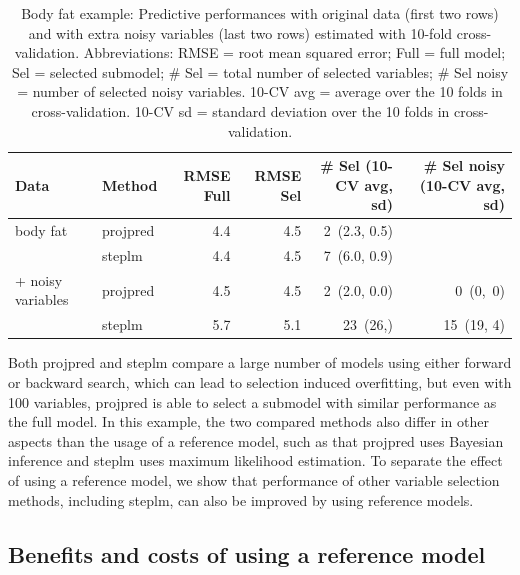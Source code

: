 \documentclass[a4]{article}
\theoremstyle{definition}
\begin{document}
\begin{table}[tp]
\footnotesize
\centering
\begin{tabular}{ll|rrrr}
Data  & Method & RMSE Full & RMSE Sel & \# Sel (10-CV avg, sd) & \# Sel noisy (10-CV avg, sd) \\ 
  \hline
body fat & projpred & 4.4 & 4.5 &  2\, (2.3, 0.5) &   \\
& steplm & 4.4 & 4.5 & 7\, (6.0, 0.9) &  \\
\hline
+ noisy variables & projpred & 4.5 & 4.5 &  2\, (2.0, 0.0)&  0\,\; (0,\, 0)  \\
& steplm & 5.7 & 5.1 & 23\, (26,\; 4.5) &  15\, (19, 4) \\
\end{tabular}
\caption{Body fat example: Predictive performances with original data (first two
  rows) and with extra noisy variables (last two rows) estimated with
  10-fold cross-validation. Abbreviations: RMSE = root mean squared error;
  Full = full model; Sel = selected submodel; 
  \# Sel = total number of selected variables;
  \# Sel noisy = number of selected noisy variables. 
  10-CV avg = average over the 10 folds in cross-validation. 10-CV sd = standard deviation
  over the 10 folds in cross-validation.}
\label{tab:model_performances}
\end{table}

Both projpred and steplm compare a large number of models using either
forward or backward search, which can lead to selection induced
overfitting, but even with 100 variables, projpred is able to select a
submodel with similar performance as the full model. In this example, the two
compared methods also differ in other aspects than the usage of a reference 
model, such as that projpred
uses Bayesian inference and steplm uses maximum likelihood estimation.
%
To separate the effect of using a reference model, we show that
performance of other variable selection methods, including steplm, can
also be improved by using reference models.

\subsection{Benefits and costs of using a reference model}
\end{document}
